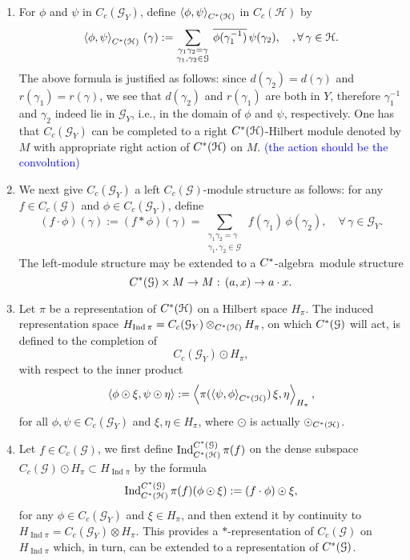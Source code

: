 \documentclass[a4paper]{amsart}
\newcommand\blue[1]{\textcolor{blue}{#1}}
\newcommand{\Ind}{\operatorname{Ind}}
\newcommand\Cstar{C\sp{\ast}}
\newcommand\Cstara{$\Cstar$-algebra}
\newcommand{\maG}{\mathcal G}
\newcommand{\maH}{\mathcal H}
\newcommand\<{\langle}
\renewcommand\>{\rangle}
\theoremstyle{definition}
\theoremstyle{remark}
\begin{document}
\begin{enumerate}
\item[\text{Step 1:}]
For $\phi$ and $\psi$ in $C_c(\maG_Y)$, define $\left\langle \phi, \psi \right \rangle_{\Cstar(\maH)}$ in $C_c(\maH)$ by
\begin{equation*}
\left\langle \phi, \psi \right \rangle_{\Cstar(\maH)} \, (\gamma):= \sum_{\substack{\gamma_1\gamma_2=\gamma \\ \gamma_1,\gamma_2 \in \maG}} \,
\overline{\phi(\gamma_1^{-1})} \,\psi(\gamma_2), \quad, \forall\, \gamma\in \maH.
\end{equation*}
The above formula is justified as follows: since $d(\gamma_2)=d(\gamma)$ and $r(\gamma_1)=r(\gamma)$, we see that $d(\gamma_2)$ and $r(\gamma_1)$
are both in $Y$, therefore $\gamma_1^{-1}$ and $\gamma_2$ indeed lie in $\maG_Y$, i.e., in the domain of $\phi$ and $\psi$, respectively. One has that $C_c(\maG_Y)$ can be completed to a right $\Cstar(\maH)$-Hilbert module denoted by $M$ with appropriate right action of $\Cstar(\maH)$ on $M$. \blue{(the action should be the convolution)}

\item[\text{Step 2:}]
We next give $C_c(\maG_Y)$ a left $C_c(\maG)$-module structure as follows: for any $f \in C_c(\maG)$ and $\phi \in C_c(\maG_Y)$, define
\begin{equation*}
(f\cdot \phi)(\gamma):=(f * \phi)(\gamma)= \sum_{\substack{\gamma_1\gamma_2=\gamma \\ \gamma_1,\gamma_2 \in \maG}} \,f(\gamma_1) \, \phi(\gamma_2), \quad \forall \, \gamma\in \maG_Y.
\end{equation*}
The left-module structure may be extended to a \Cstara \, module structure
$$\Cstar(\maG) \times M \rightarrow M: \, (a, x)\rightarrow a\cdot x.$$

\item[\text{Step 3:}]
Let $\pi$ be a representation of $\Cstar(\maH)$ on a Hilbert space $H_{\pi}$. The induced representation space $H_{\Ind \pi}= C_c(\maG_Y)\otimes_{\Cstar(\maH)} H_{\pi}$, on which
 $\Cstar(\maG)$ will act, is defined to the completion of
 $$ C_c(\maG_Y) \odot H_\pi,$$
with respect to the inner product
$$\left \langle \phi\odot \xi, \psi \odot \eta \right\rangle := \left\langle \pi (\left\langle \psi, \phi \right\rangle_{\Cstar(\maH)}) \, \xi, \eta \right\rangle_{H_\pi},$$
for all $ \phi, \psi \in C_c(\maG_Y)$ and $ \xi,\eta \in H_{\pi}$, where $\odot$ is actually $\odot_{\Cstar(\maH)}$.

\item[\text{Step 4:}]
Let $f\in C_c(\maG)$, we first define $\Ind_{\Cstar(\maH)}^{\Cstar(\maG)}\pi (f)$ on the dense subspace $C_c(\maG) \odot H_\pi\subset H_{\Ind \pi}$ by the formula
$$\Ind_{\Cstar(\maH)}^{\Cstar(\maG)}\pi (f) (\phi \odot \xi):= (f \cdot \phi) \odot \xi,$$
for any $\phi \in C_c(\maG_Y)$ and $\xi \in H_{\pi}$, and then extend it by continuity to $H_{\Ind \pi}= C_c(\maG_Y)\otimes H_{\pi}$. This provides a $*$-representation of $C_c(\maG)$ on $H_{\Ind \pi}$ which, in turn, can be extended to a representation of $\Cstar(\maG)$.
\end{enumerate}
\end{document}
